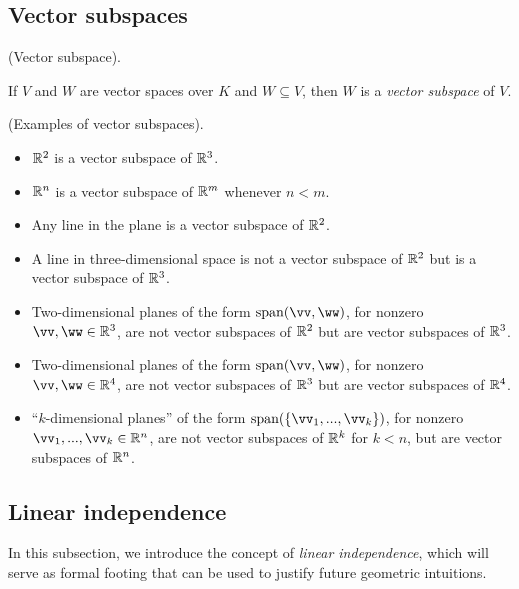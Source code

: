 \subsection*{Vector subspaces}

\begin{defn}
\label{ch::lin_alg::defn::vector_subspace}
    (Vector subspace). 
    
    If $V$ and $W$ are vector spaces over $K$ and $W \subseteq V$, then $W$ is a \textit{vector subspace} of $V$.
\end{defn}

\begin{remark}
    (Examples of vector subspaces).
    
    \begin{itemize}
        \item $\mathbb{R}^2$ is a vector subspace of $\mathbb{R}^3$.
        \item $\mathbb{R}^n$ is a vector subspace of $\mathbb{R}^m$ whenever $n < m$.
        \item Any line in the plane is a vector subspace of $\mathbb{R}^2$.
        \item A line in three-dimensional space is not a vector subspace of $\mathbb{R}^2$ but is a vector subspace of $\mathbb{R}^3$.
        \item Two-dimensional planes of the form $\spann(\vv, \ww)$, for nonzero $\vv, \ww \in \R^3$, are not vector subspaces of $\mathbb{R}^2$ but are vector subspaces of $\mathbb{R}^3$.
        \item Two-dimensional planes of the form $\spann(\vv, \ww)$, for nonzero $\vv, \ww \in \R^4$, are not vector subspaces of $\mathbb{R}^3$ but are vector subspaces of $\mathbb{R}^4$.
        \item ``$k$-dimensional planes'' of the form $\spann(\{\vv_1, ..., \vv_k\})$, for nonzero $\vv_1, ..., \vv_k \in \R^n$, are not vector subspaces of $\mathbb{R}^k$ for $k < n$, but are vector subspaces of $\mathbb{R}^n$.
    \end{itemize}
\end{remark}

\newpage

\subsection*{Linear independence}

In this subsection, we introduce the concept of \textit{linear independence}, which will serve as formal footing that can be used to justify future geometric intuitions.

